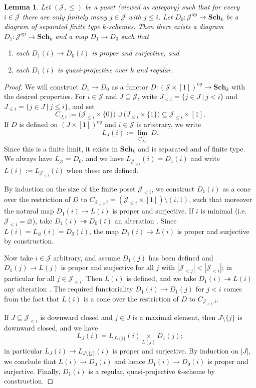 \documentclass[11pt]{amsart}
\newtheorem{Lemma}[Thm]{Lemma}
\theoremstyle{definition}
\newcommand{\op}{^{\operatorname{op}}}
\newcommand{\Sch}{\mathbf{Sch}}
\newcommand{\fancyitem}[1]{%
 \renewcommand{\theenumi}{#1}
 \refstepcounter{enumi}
 \item[\rm #1]
}
\begin{document}
\begin{Lemma}\label{Lem resolution of diagram}
Let $(\mathscr J, \leq)$ be a poset (viewed as category) such that
for every $i \in \mathscr J$ there are only finitely many $j \in
\mathscr J$ with $j \leq i$. Let $D_0 \colon \mathscr J\op \to
\Sch_k$ be a diagram of separated finite type $k$-schemes. Then
there exists a diagram $D_1 \colon \mathscr J\op \to \Sch_k$ and a
map $D_1 \to D_0$ such that
\begin{enumerate}
\fancyitem{(\arabic{enumi})} each $D_1(i) \to D_0(i)$ is proper and
surjective, and \fancyitem{(\arabic{enumi})} each $D_1(i)$ is
quasi-projective over $k$ and regular.
\end{enumerate}
\end{Lemma}

\begin{proof}
We will construct $D_1 \to D_0$ as a functor $D \colon (\mathscr J
\times [1])\op \to \Sch_k$ with the desired properties. For $i \in
\mathscr J$ and $J \subseteq \mathscr J$, write $J_{<i} = \{j \in J\
|\ j < i\}$ and $J_{\leq i} = \{j \in J\ |\ j \leq i\}$, and set
\[
C_{J,i} := \Big(\mathscr J_{\leq i} \times \{0\}\Big) \cup
\Big(J_{\leq i} \times \{1\}\Big) \subseteq \mathscr J_{\leq i}
\times [1].
\]
If $D$ is defined on $(J \times [1])\op$ and $i \in \mathscr J$ is
arbitrary, we write
\[
L_J(i) := \lim_{C_{J,i}\op}\ D.
\]
Since this is a finite limit, it exists in $\Sch_k$ and is separated
and of finite type. We always have $L_\varnothing = D_0$, and we
have $L_{\mathscr J_{\leq i}}(i) = D_1(i)$ and write $L(i) :=
L_{\mathscr J_{<i}}(i)$ when these are defined.

By induction on the size of the finite poset $\mathscr J_{<i}$, we construct $D_1(i)$
as a cone over the restriction of $D$ to $C_{\mathscr J_{<i},i} =
(\mathscr J_{\leq i} \times [1]) \setminus (i,1)$, such that
moreover the natural map $D_1(i) \to L(i)$ is proper and surjective.
If $i$ is minimal (i.e.\ $\mathscr J_{<i} = \varnothing$), take
$D_1(i) \twoheadrightarrow D_0(i)$ an alteration \cite[Theorem~4.1]{dJ}. Since $L(i) = L_\varnothing(i) = D_0(i)$, the map $D_1(i)
\to L(i)$ is proper and surjective by construction.

Now take $i \in \mathscr J$ arbitrary, and assume $D_1(j)$ has been
defined and $D_1(j) \to L(j)$ is proper and surjective for all $j$
with $|\mathscr J_{< j}| < |\mathscr J_{< i}|$; in particular for
all $j \in \mathscr J_{<i}$. Then $L(i)$ is defined, and we take
$D_1(i) \twoheadrightarrow L(i)$ any alteration \cite{dJ}. The
required functoriality $D_1(i) \to D_1(j)$ for $j < i$ comes from
the fact that $L(i)$ is a cone over the restriction of $D$ to
$C_{\mathscr J_{<i},i}$.

If $J \subseteq \mathscr J_{<i}$ is downward closed and $j \in J$ is
a maximal element, then $J\setminus\{j\}$ is downward closed, and we
have
\[
L_J(i) = L_{J\setminus\{j\}}(i) \underset{L(j)}\times D_1(j);
\]
in particular $L_J(i) \to L_{J\setminus\{j\}}(i)$ is proper and
surjective. By induction on $|J|$, we conclude that $L(i) \to
D_0(i)$ and hence $D_1(i) \to D_0(i)$ is proper and surjective.
Finally, $D_1(i)$ is a regular, quasi-projective $k$-scheme by
construction.
\end{proof}
\end{document}
